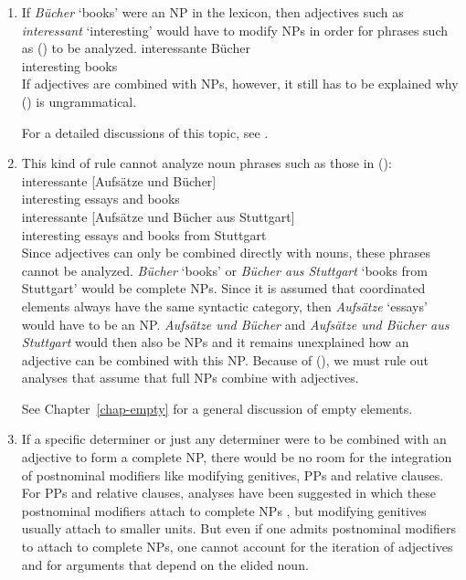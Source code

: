 \begin{enumerate}
\item %

If \emph{Bücher} `books' were an NP in the lexicon, then adjectives such as \emph{interessant} `interesting' would have to modify
NPs in order for phrases such as () to be analyzed.
\ea
\gll interessante Bücher\\
     interesting books\\
\z
If adjectives are combined with NPs, however, it still has to be explained why () is ungrammatical.
\z

For a detailed discussions of this topic, see .\nocite{MuellerLehrbuch1}

\item %

This kind of rule cannot analyze noun phrases such as those in ():
\eal
\ex 
\gll interessante [Aufsätze und Bücher]\\
     interesting \spacebr{}essays and books\\
\ex 
\gll interessante [Aufsätze und Bücher aus Stuttgart]\\
     interesting \spacebr{}essays and books from Stuttgart\\
\zl
Since adjectives can only be combined directly with nouns, these phrases cannot be analyzed. 
 \emph{Bücher} `books' or \emph{Bücher aus Stuttgart} `books from Stuttgart' would be complete NPs.
 Since it is assumed that coordinated elements always have the same syntactic category, then \emph{Aufsätze} `essays'
 would have to be an NP. \emph{Aufsätze und Bücher} and \emph{Aufsätze und Bücher aus
  Stuttgart} would then also be NPs and it remains unexplained how an adjective can be combined with this NP.
Because of (), we must rule out analyses that assume that full NPs combine with adjectives.

See Chapter~\ref{chap-empty} for a general discussion of empty elements.

\item 
If a specific determiner or just any determiner were to be combined with an adjective to form a
complete NP, there would be no room for the integration of postnominal modifiers like modifying
genitives, PPs and relative clauses. For PPs and relative clauses, analyses have been suggested in
which these postnominal modifiers attach to complete NPs \citep{Kiss2005a}, but modifying genitives usually attach to
smaller units. But even if one admits postnominal modifiers to attach to complete NPs, one cannot
account for the iteration of adjectives and for arguments that depend on the elided noun.
 

\end{enumerate}
